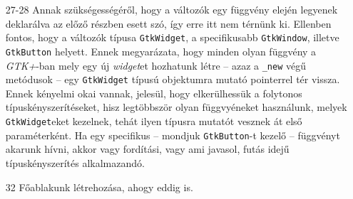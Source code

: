 \begin{enumerate}
 \item[27-28] Annak szükségességéről, hogy a változók egy függvény elején legyenek deklarálva az előző részben esett szó, így erre itt nem térnünk ki. Ellenben fontos, hogy a változók típusa \texttt{GtkWidget}, a specifikusabb \texttt{GtkWindow}, illetve \texttt{GtkButton} helyett. Ennek megyarázata, hogy minden olyan függvény a \textit{GTK+}-ban mely egy új \textit{widget}et hozhatunk létre -- azaz a \texttt{\_new} végű metódusok -- egy \texttt{GtkWidget} típusú objektumra mutató pointerrel tér vissza. Ennek kényelmi okai vannak, jelesül, hogy elkerülhessük a folytonos típuskényszerítéseket, hisz legtöbbször olyan függvyéneket használunk, melyek \texttt{GtkWidget}eket kezelnek, tehát ilyen típusra mutatót vesznek át első paraméterként. Ha egy specifikus -- mondjuk \texttt{GtkButton}-t kezelő -- függvényt akarunk hívni, akkor vagy fordítási, vagy ami javasol, futás idejű típuskényszerítés alkalmazandó.

 \item[32] Főablakunk létrehozása, ahogy eddig is.


\end{enumerate}
